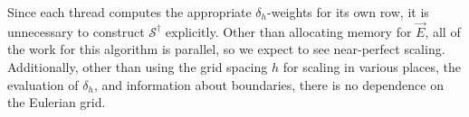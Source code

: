 Since each thread computes the appropriate $\delta_h$-weights for its own row,
it is unnecessary to construct $\mathcal{S}^\dagger$ explicitly. Other than
allocating memory for $\vec{E}$, all of the work for this algorithm is
parallel, so we expect to see near-perfect scaling. Additionally, other than
using the grid spacing $h$ for scaling in various places, the evaluation
of $\delta_h$, and information about boundaries, there is no dependence on the 
Eulerian grid.
